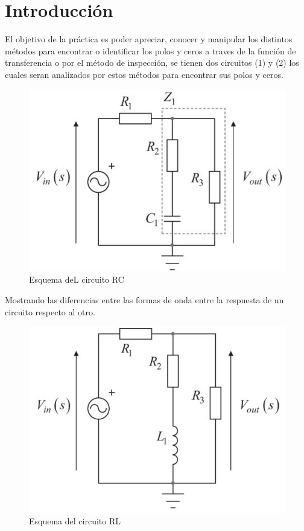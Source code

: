 \documentclass[letterpaper,10pt]{article}
\begin{document}
	\pagebreak
	\justify
	\pagebreak
	\section{Introducción}
	\vspace*{0.3in}
	El objetivo de la práctica es poder apreciar, conocer y manipular los distintos métodos para encontrar o identificar los polos y ceros a traves de la función de transferencia o por el método de inspección, se tienen dos circuitos (1) y (2) los cuales seran analizados por estos métodos para encontrar sus polos y ceros.
	
	\begin{figure}[h!]
		\centering
		\includegraphics[scale=0.4]{CIRCUITORC}
		\caption{Esquema deL circuito RC}
	\end{figure}
	
		\vspace*{0.3in}
	
	Mostrando las diferencias entre las formas de onda entre la respuesta de un circuito respecto al otro.
	
	\begin{figure}[h!]
		\centering
		\includegraphics[scale=0.4]{CIRCUITORL}
		\caption{Esquema del circuito RL}
	\end{figure}
\end{document}
